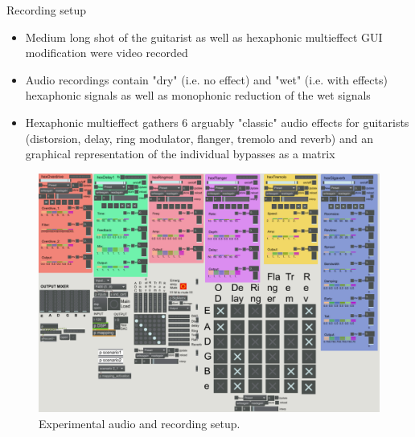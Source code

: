 \documentclass[final]{beamer}
\newlength{\onecolwid}
\newlength{\twocolwid}
\begin{document}
\begin{frame}[t]
\begin{columns}[t]
\begin{column}{\onecolwid}
\begin{block}{Recording setup}
\begin{itemize}
    \item Medium long shot of the guitarist as well as hexaphonic multieffect GUI modification were video recorded
    \item Audio recordings contain "dry" (i.e. no effect) and "wet" (i.e. with effects) hexaphonic signals as well as monophonic reduction of the wet signals
    \item Hexaphonic multieffect gathers 6 arguably "classic" audio effects for guitarists (distorsion, delay, ring modulator, flanger, tremolo and reverb) and an graphical representation of the individual bypasses as a matrix
\end{itemize}

\begin{figure}[h]
\includegraphics[width = 0.7\onecolwid]{img/191025-Patch-experience.png}
\caption{Experimental audio and recording setup.}
\label{demo}
\end{figure}

\end{block}










\end{column}
\end{columns}
\end{frame}
\end{document}
